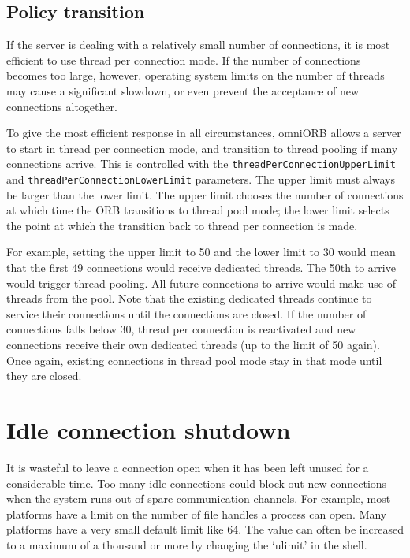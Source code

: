 \documentclass[11pt,twoside,a4paper]{book}
\newcommand{\code}[1]{\texttt{#1}}
\newcommand{\dsc}{\discretionary{}{}{}}
\begin{document}
\subsection{Policy transition}

If the server is dealing with a relatively small number of
connections, it is most efficient to use thread per connection mode.
If the number of connections becomes too large, however, operating
system limits on the number of threads may cause a significant
slowdown, or even prevent the acceptance of new connections
altogether.

To give the most efficient response in all circumstances, omniORB
allows a server to start in thread per connection mode, and transition
to thread pooling if many connections arrive. This is controlled with
the \code{threadPerConnection\dsc{}UpperLimit} and
\code{threadPerConnectionLowerLimit} parameters. The upper limit must
always be larger than the lower limit. The upper limit chooses the
number of connections at which time the ORB transitions to thread pool
mode; the lower limit selects the point at which the transition back
to thread per connection is made.

For example, setting the upper limit to 50 and the lower limit to 30
would mean that the first 49 connections would receive dedicated
threads. The 50th to arrive would trigger thread pooling. All future
connections to arrive would make use of threads from the pool. Note
that the existing dedicated threads continue to service their
connections until the connections are closed. If the number of
connections falls below 30, thread per connection is reactivated and
new connections receive their own dedicated threads (up to the limit
of 50 again). Once again, existing connections in thread pool mode
stay in that mode until they are closed.


\section{Idle connection shutdown}
\label{sec:connShutdown}

It is wasteful to leave a connection open when it has been left unused
for a considerable time. Too many idle connections could block out new
connections when the system runs out of spare communication channels.
For example, most platforms have a limit on the number of file handles
a process can open. Many platforms have a very small default limit
like 64. The value can often be increased to a maximum of a thousand
or more by changing the `ulimit' in the shell.
\end{document}
